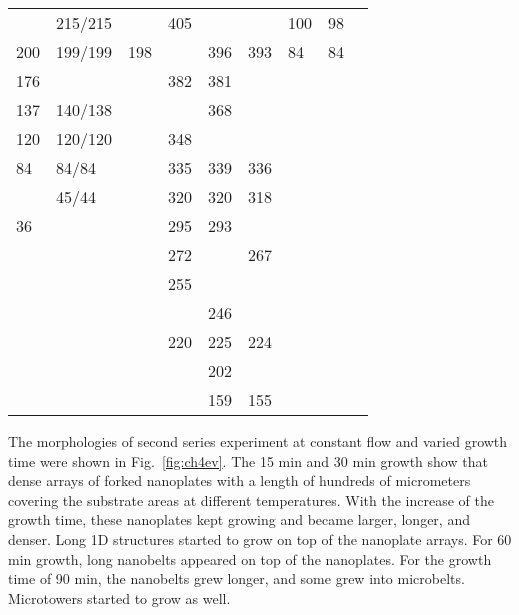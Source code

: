 \begin{landscape}
\begin{table}[htb]
\begin{tabular}{lllllllll}
        & 215/215 &             & 405    &        &             & 100    & 98        &       \\
 200    & 199/199 & 198         &        & 396    & 393         & 84     & 84        &       \\
 176    &         &             & 382    & 381    &             &        &           &       \\
 137    & 140/138 &             &        & 368    &             &        &           &       \\
 120    & 120/120 &             & 348    &        &             &        &           &       \\
 84     & 84/84   &             & 335    & 339    & 336         &        &           &       \\
        & 45/44   &             & 320    & 320    & 318         &        &           &       \\
 36     &         &             & 295    & 293    &             &        &           &       \\
        &         &             & 272    &        & 267         &        &           &       \\
        &         &             & 255    &        &             &        &           &       \\
        &         &             &        & 246    &             &        &           &       \\
        &         &             & 220    & 225    & 224         &        &           &       \\
        &         &             &        & 202    &             &        &           &       \\
        &         &             &        & 159    & 155         &        &           &       \\
\bottomrule
\end{tabular}
\end{table}
\end{landscape}
The morphologies of second series experiment at constant  flow and varied growth time were shown in Fig.~\ref{fig:ch4ev}. The 15 min and 30 min growth show that dense arrays of  forked nanoplates with a length of hundreds of micrometers covering the substrate areas at different temperatures. With the increase of the growth time, these nanoplates kept growing and became larger, longer, and denser. Long 1D  structures started to grow on top of the nanoplate arrays. For 60 min growth, long nanobelts appeared on top of the nanoplates. For the growth time of 90 min, the nanobelts grew longer, and some grew into microbelts. Microtowers started to grow as well.

